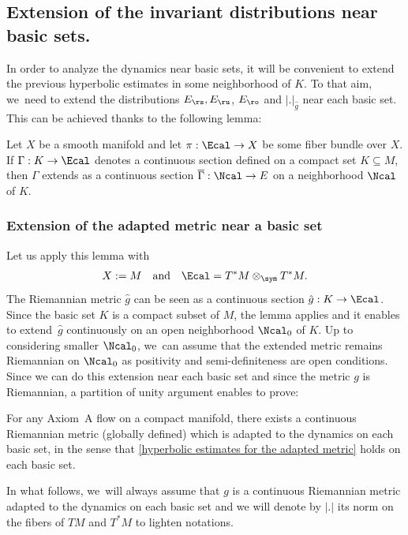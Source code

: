 \subsection{Extension of the invariant distributions near basic sets.}

In order to analyze the dynamics near basic sets, it will be convenient to extend the previous hyperbolic estimates in some neighborhood of $K$. To that aim, we~need to extend the distributions $E_\rs, E_\ru$, $E_\ro$ and $|.|_{\hat{g}}$ near each basic set. This can be achieved thanks to the following lemma:

\begin{lemma}\label{Lemme geometrique prolongement des sections} Let $X$ be a smooth manifold and let $\pi: \Ecal \to X$ be some fiber bundle over $X$. If $\Gamma: K \to \Ecal$ denotes a continuous section defined on a compact set $K \subseteq M$, then $\Gamma$ extends as a continuous section $\overline{\Gamma}: \Ncal \to E$ on a neighborhood $\Ncal$ of $K$.
\end{lemma}

\subsubsection{Extension of the adapted metric near a basic set} Let us apply this lemma with
\[
X:= M \quad \text{and} \quad \Ecal = T^* M \otimes_{\sym} T^* M.
\]
The Riemannian metric $\hat{g}$ can be seen as a continuous section $\hat{g}: K \to \Ecal$. Since the basic set $K$ is a compact subset of $M$, the lemma applies and it enables to extend~$\hat{g}$ continuously on an open neighborhood $\Ncal_0$ of $K$. Up to considering smaller $\Ncal_0$, we~can assume that the extended metric remains Riemannian on $\Ncal_0$ as positivity and semi-definiteness are open conditions. Since we can do this extension near each basic set and since the metric $g$ is Riemannian, a partition of unity argument enables to prove:

\begin{lemma}
For any Axiom~A flow on a compact manifold, there exists a continuous Riemannian metric (globally defined) which is adapted to the dynamics on each basic set, in the sense that \eqref{hyperbolic estimates for the adapted metric} holds on each basic set.
\end{lemma}

In what follows, we~will always assume that $g$ is a continuous Riemannian metric adapted to the dynamics on each basic set and we will denote by $|.|$ its norm on the fibers of $TM$ and $T^* M$ to lighten notations.

